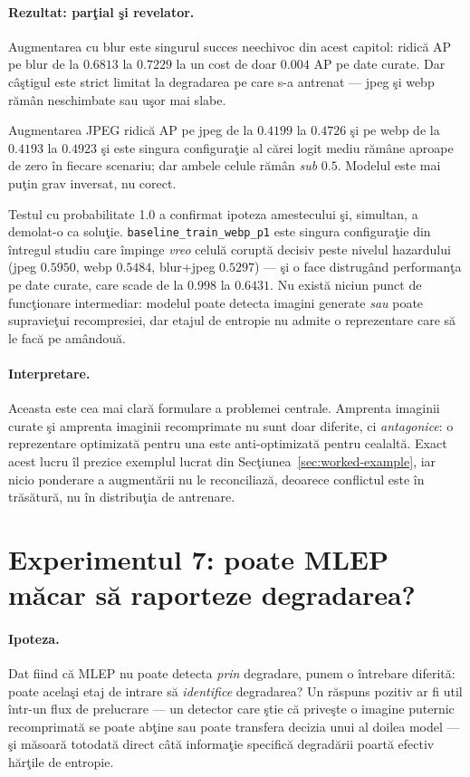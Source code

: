 \paragraph{Rezultat: parţial şi revelator.} Augmentarea cu blur este singurul
succes neechivoc din acest capitol: ridică AP pe blur de la $0.6813$ la $0.7229$
la un cost de doar $0.004$ AP pe date curate. Dar câştigul este strict limitat la
degradarea pe care s-a antrenat --- jpeg şi webp rămân neschimbate sau uşor mai
slabe.

Augmentarea JPEG ridică AP pe jpeg de la $0.4199$ la $0.4726$ şi pe webp de la
$0.4193$ la $0.4923$ şi este singura configuraţie al cărei logit mediu rămâne
aproape de zero în fiecare scenariu; dar ambele celule rămân \emph{sub} $0.5$.
Modelul este mai puţin grav inversat, nu corect.

Testul cu probabilitate 1.0 a confirmat ipoteza amestecului şi, simultan, a
demolat-o ca soluţie. \texttt{baseline\_train\_webp\_p1} este singura
configuraţie din întregul studiu care împinge \emph{vreo} celulă coruptă
decisiv peste nivelul hazardului (jpeg $0.5950$, webp $0.5484$, blur+jpeg
$0.5297$) --- şi o face distrugând performanţa pe date curate, care scade de la
$0.998$ la $0.6431$. Nu există niciun punct de funcţionare intermediar: modelul
poate detecta imagini generate \emph{sau} poate supravieţui recompresiei, dar
etajul de entropie nu admite o reprezentare care să le facă pe amândouă.

\paragraph{Interpretare.} Aceasta este cea mai clară formulare a problemei
centrale. Amprenta imaginii curate şi amprenta imaginii recomprimate nu sunt doar
diferite, ci \emph{antagonice}: o reprezentare optimizată pentru una este
anti-optimizată pentru cealaltă. Exact acest lucru îl prezice exemplul lucrat din
Secţiunea~\ref{sec:worked-example}, iar nicio ponderare a augmentării nu le
reconciliază, deoarece conflictul este în trăsătură, nu în distribuţia de
antrenare.

\section{Experimentul 7: poate MLEP măcar să raporteze degradarea?}
\label{sec:exp-degradation}

\paragraph{Ipoteza.} Dat fiind că MLEP nu poate detecta \emph{prin} degradare,
punem o întrebare diferită: poate acelaşi etaj de intrare să \emph{identifice}
degradarea? Un răspuns pozitiv ar fi util într-un flux de prelucrare --- un
detector care ştie că priveşte o imagine puternic recomprimată se poate abţine
sau poate transfera decizia unui al doilea model --- şi măsoară totodată direct
câtă informaţie specifică degradării poartă efectiv hărţile de entropie.

